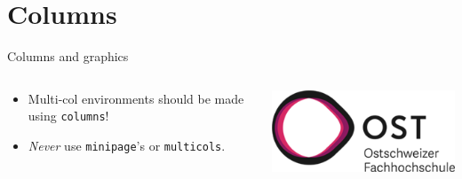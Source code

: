 \documentclass[aspectratio=169,envcountsect]{beamer}    %
\begin{document}
\section{Columns}
\begin{frame}{Columns and graphics}
    \begin{columns}[onlytextwidth]
        \begin{column}{0.5\textwidth}
            \begin{itemize}
                \item Multi-col environments should be made using \texttt{columns}!
                \item \emph{Never} use \texttt{minipage}'s or \texttt{multicols}.
            \end{itemize}
        \end{column}
        \begin{column}{0.5\textwidth}
            \centering
            \includegraphics[width=0.6\linewidth]{header/ost_logo}
        \end{column}
    \end{columns}
\end{frame}
%
%    

\end{document}

